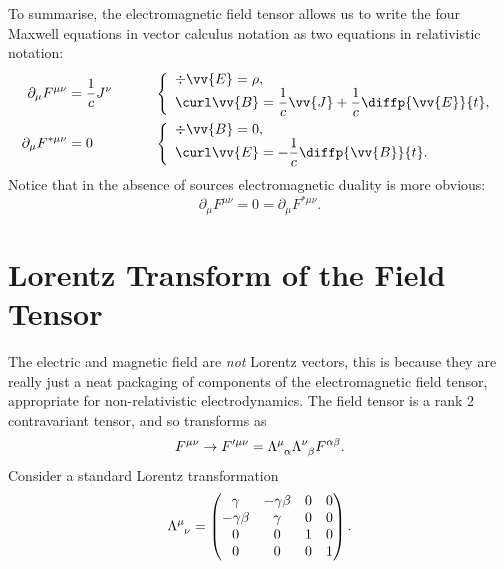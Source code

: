 To summarise, the electromagnetic field tensor allows us to write the four Maxwell equations in vector calculus notation as two equations in relativistic notation:
\begin{alignat}{3}
    \partial_\mu F^{\mu\nu} &= \frac{1}{c} J^\nu \qquad && \left\{
    \begin{array}{l}
        \displaystyle \div\vv{E} = \rho,\\
        \displaystyle \curl\vv{B} = \frac{1}{c}\vv{J} + \frac{1}{c}\diffp{\vv{E}}{t},
    \end{array}
    \right.\\
    \partial_\mu F^{*\mu\nu} &= 0 \qquad && \left\{
    \begin{array}{l}
        \displaystyle \div\vv{B} = 0,\\
        \displaystyle \curl\vv{E} = -\frac{1}{c}\diffp{\vv{B}}{t}.
    \end{array}
    \right.
\end{alignat}
Notice that in the absence of sources electromagnetic duality is more obvious:
\begin{equation}
    \partial_\mu F^{\mu\nu} = 0 = \partial_\mu F^{*\mu\nu}.
\end{equation}

\section{Lorentz Transform of the Field Tensor}
The electric and magnetic field are \emph{not} Lorentz vectors, this is because they are really just a neat packaging of components of the electromagnetic field tensor, appropriate for non-relativistic electrodynamics.
The field tensor is a rank 2 contravariant tensor, and so transforms as
\begin{equation}
    F^{\mu\nu} \to F'^{\mu\nu} = \tensor{\Lambda}{^\mu_\alpha} \tensor{\Lambda}{^\nu_\beta} F^{\alpha\beta}.
\end{equation}
Consider a standard Lorentz transformation
\begin{equation}
    \tensor{\Lambda}{^\mu_\nu} = 
    \begin{pmatrix}
        \gamma & -\gamma\beta & 0 & 0\\
        -\gamma\beta & \gamma & 0 & 0\\
        0 & 0 & 1 & 0\\
        0 & 0 & 0 & 1
    \end{pmatrix}
    .
\end{equation}

